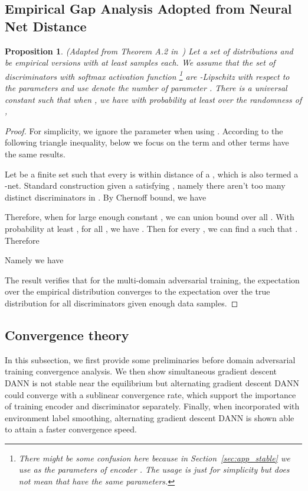 \documentclass{article} \usepackage{iclr2023_conference,times}
\newtheorem{prop}{Proposition}
\begin{document}
\subsection{Empirical Gap Analysis Adopted from Neural Net Distance}\label{sec:empirical_nn}
\begin{prop}
(Adapted from Theorem A.2 in~\citep{arora2017generalization}) Let  a set of distributions and  be empirical versions with at least  samples each. We assume that the set of discriminators with softmax activation function \footnote{There might be some confusion here because in Section~\ref{sec:app_stable} we use  as the parameters of encoder . The usage is just for simplicity but does not mean that  have the same parameters.} are -Lipschitz with respect to the parameters  and use  denote the number of parameter . There is a universal constant  such that when , we have with probability at least  over the randomness of ,

\label{prop4}
\end{prop}
\begin{proof}
For simplicity, we ignore the parameter  when using . According to the following triangle inequality, below we focus on the term  and other terms have the same results. 

Let  be a finite set such that every  is within distance  of a , which is also termed a -net. Standard construction given a  satisfying , namely there aren’t too many distinct discriminators in . By Chernoff bound, we have

Therefore, when  for large enough constant , we can union bound over all . With probability at least , for all , we have . Then for every , we can find a  such that . Therefore

Namely we have

The result verifies that for the multi-domain adversarial training, the expectation over the empirical distribution converges to the expectation over the true distribution for all discriminators given enough data samples.
\end{proof}

\subsection{Convergence theory}\label{sec:app_convergence}

In this subsection, we first provide some preliminaries before domain adversarial training convergence analysis. We then show simultaneous gradient descent DANN is not stable near the equilibrium but alternating gradient descent DANN could converge with a sublinear convergence rate, which support the importance of training encoder and discriminator separately. Finally, when incorporated with environment label smoothing, alternating gradient descent DANN is shown able to attain a faster convergence speed.
\end{document}
